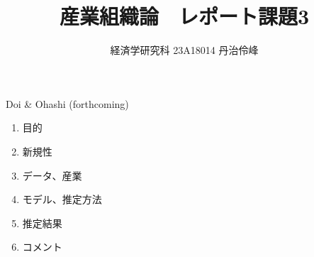 \documentclass{jsarticle}
\begin{document}
\title{産業組織論　レポート課題3}
\author{経済学研究科 23A18014 丹治伶峰}
\date{}
\maketitle

Doi \& Ohashi (forthcoming)

\begin{enumerate}

\item 目的

\item 新規性

\item データ、産業

\item モデル、推定方法

\item 推定結果

\item コメント

\end{enumerate}
\end{document}
